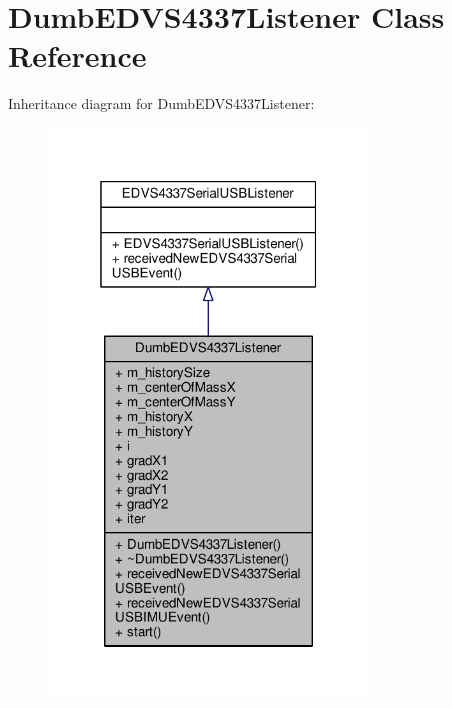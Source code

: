 \hypertarget{class_dumb_e_d_v_s4337_listener}{}\section{Dumb\+E\+D\+V\+S4337\+Listener Class Reference}
\label{class_dumb_e_d_v_s4337_listener}


Inheritance diagram for Dumb\+E\+D\+V\+S4337\+Listener\+:
\nopagebreak
\begin{figure}[H]
\begin{center}
\leavevmode
\includegraphics[width=241pt]{class_dumb_e_d_v_s4337_listener__inherit__graph}
\end{center}
\end{figure}



